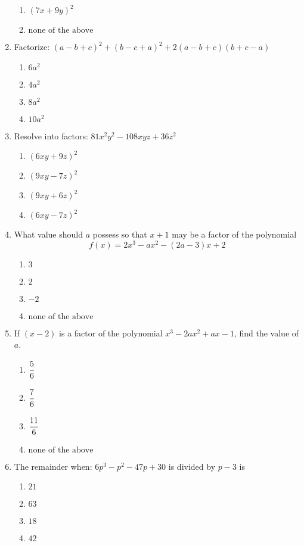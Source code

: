 \begin{multicols}{2}
\begin{enumerate}[label={\arabic*.}]
\begin{enumerate}[label={\Alph*.}]
	\item \((7x + 9y)^2\)
	\item \( \text{none of the above}\)
	\end{enumerate}
\item Factorize: $(a-b+c)^2 + (b-c+a)^2 + 2(a -b +c)(b+c-a)$
	\begin{enumerate}[label={\Alph*.}]
	\item \(6a^2\)
	\item \(4a^2\)
	\item \(8a^2\)
	\item \(10a^2\)
	\end{enumerate}
\item Resolve into factors: $81x^2y^2 - 108xyz + 36z^2$
	\begin{enumerate}[label={\Alph*.}]
	\item \((6xy + 9z)^2\)
	\item \((9xy - 7z)^2\)
	\item \((9xy + 6z)^2\)
	\item \((6xy - 7z)^2\)
	\end{enumerate}
\item What value should $a$ possess so that $x+1$ may be a factor of the polynomial \[f(x) = 2x^3 - ax^2 - (2a -3)x + 2\]
	\begin{enumerate}[label={\Alph*.}]
	\item \(3\)
	\item \(2\)
	\item \(-2\)
	\item \(\text{none of the above}\)
	\end{enumerate}
\item If $(x-2)$ is a factor of the polynomial $x^3 - 2ax^2 +ax -1$, find the value of \(a\).
	\begin{enumerate}[label={\Alph*.}]
	\item \(\cfrac{5}{6}\)
	\item \(\cfrac{7}{6}\)
	\item \(\cfrac{11}{6}\)
	\item \(\text{none of the above}\)
	\end{enumerate}
\item The remainder when: \(6p^3 - p^2 -47p + 30\) is divided by \(p-3\) is 	
\begin{enumerate}[label={\Alph*.}]
	\item \(21\)
	\item \(63\)
	\item \(18\)
	\item \(42\)

\end{enumerate}
\end{enumerate}
\end{multicols}
